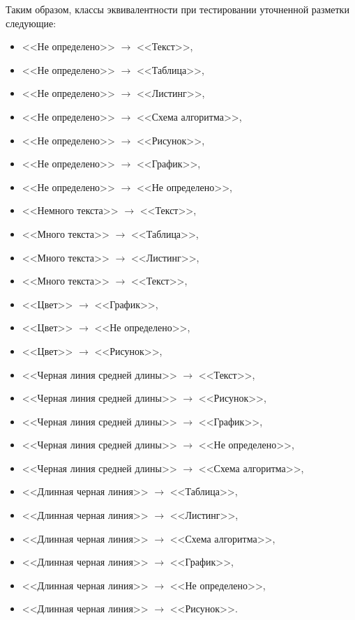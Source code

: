 Таким образом, классы эквивалентности при тестировании уточненной разметки следующие:
\begin{itemize}
    \item <<Не определено>> $\rightarrow$ <<Текст>>,
    \item <<Не определено>> $\rightarrow$ <<Таблица>>,
    \item <<Не определено>> $\rightarrow$ <<Листинг>>,
    \item <<Не определено>> $\rightarrow$ <<Схема алгоритма>>,
    \item <<Не определено>> $\rightarrow$ <<Рисунок>>,
    \item <<Не определено>> $\rightarrow$ <<График>>,
    \item <<Не определено>> $\rightarrow$ <<Не определено>>,
    \item <<Немного текста>> $\rightarrow$ <<Текст>>,
    \item <<Много текста>> $\rightarrow$ <<Таблица>>,
    \item <<Много текста>> $\rightarrow$ <<Листинг>>,
    \item <<Много текста>> $\rightarrow$ <<Текст>>,
    \item <<Цвет>> $\rightarrow$ <<График>>,
    \item <<Цвет>> $\rightarrow$ <<Не определено>>,
    \item <<Цвет>> $\rightarrow$ <<Рисунок>>,
    \item <<Черная линия средней длины>> $\rightarrow$ <<Текст>>,
    \item <<Черная линия средней длины>> $\rightarrow$ <<Рисунок>>,
    \item <<Черная линия средней длины>> $\rightarrow$ <<График>>,
    \item <<Черная линия средней длины>> $\rightarrow$ <<Не определено>>,
    \item <<Черная линия средней длины>> $\rightarrow$ <<Схема алгоритма>>,
    \item <<Длинная черная линия>> $\rightarrow$ <<Таблица>>,
    \item <<Длинная черная линия>> $\rightarrow$ <<Листинг>>,
    \item <<Длинная черная линия>> $\rightarrow$ <<Схема алгоритма>>,
    \item <<Длинная черная линия>> $\rightarrow$ <<График>>,
    \item <<Длинная черная линия>> $\rightarrow$ <<Не определено>>,
    \item <<Длинная черная линия>> $\rightarrow$ <<Рисунок>>.
\end{itemize}

